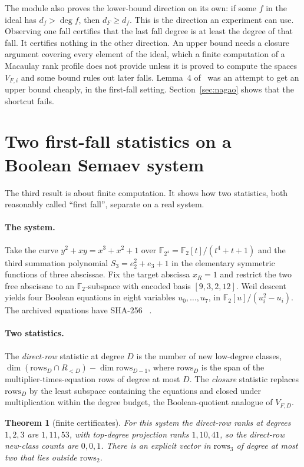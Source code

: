 \documentclass[11pt,a4paper]{article}
\theoremstyle{plain}
\newtheorem{theorem}{Theorem}
\theoremstyle{definition}
\theoremstyle{remark}
\newcommand{\FF}{\mathbb{F}}
\begin{document}
The module also proves the lower-bound direction on its own: if some $f$ in
the ideal has $d_f>\deg f$, then $d_F\ge d_f$. This is the direction an
experiment can use. Observing one fall certifies that the last fall degree is
at least the degree of that fall. It certifies nothing in the other
direction. An upper bound needs a closure argument covering every element of
the ideal, which a finite computation of a Macaulay rank profile does not
provide unless it is proved to compute the spaces $V_{F,i}$ and some bound
rules out later falls. Lemma~4 of~\cite{nagao15} was an attempt to get an
upper bound cheaply, in the first-fall setting. Section~\ref{sec:nagao} shows
that the shortcut fails.

\section{Two first-fall statistics on a Boolean Semaev system}\label{sec:semaev}

The third result is about finite computation. It shows how two statistics,
both reasonably called ``first fall'', separate on a real system.

\paragraph{The system.} Take the curve $y^2+xy=x^3+x^2+1$ over
$\FF_{2^4}=\FF_2[t]/(t^4+t+1)$ and the third summation polynomial
$S_3=e_2^2+e_3+1$ in the elementary symmetric functions of three abscissae.
Fix the target abscissa $x_R=1$ and restrict the two free abscissae to an
$\FF_2$-subspace with encoded basis $[9,3,2,12]$. Weil descent yields four
Boolean equations in eight variables $u_0,\dots,u_7$, in
$\FF_2[u]/(u_i^2-u_i)$. The archived equations have SHA-256
~\cite{artifacts}.

\paragraph{Two statistics.} The \emph{direct-row} statistic at degree $D$ is
the number of new low-degree classes,
$\dim(\mathrm{rows}_D\cap R_{<D})-\dim\mathrm{rows}_{D-1}$, where
$\mathrm{rows}_D$ is the span of the multiplier-times-equation rows of degree
at most $D$. The \emph{closure} statistic replaces $\mathrm{rows}_D$ by the
least subspace containing the equations and closed under multiplication
within the degree budget, the Boolean-quotient analogue of $V_{F,D}$.

\begin{theorem}[finite certificates]\label{thm:semaev}
For this system the direct-row ranks at degrees $1,2,3$ are $1,11,53$, with
top-degree projection ranks $1,10,41$, so the direct-row new-class counts are
$0,0,1$. There is an explicit vector in $\mathrm{rows}_3$ of degree at most two
that lies outside $\mathrm{rows}_2$.
\end{theorem}
\end{document}

